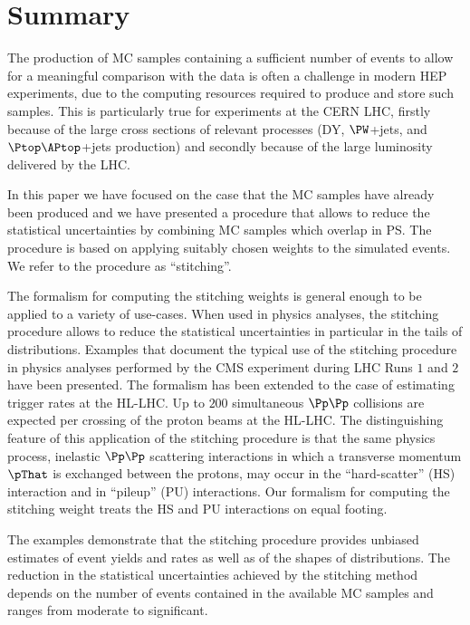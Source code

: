 \section{Summary}
\label{sec:summary}

The production of MC samples containing a sufficient number of events to allow for a meaningful comparison with the data is often a challenge in modern HEP experiments,
due to the computing resources required to produce and store such samples.
This is particularly true for experiments at the CERN LHC,
firstly because of the large cross sections of relevant processes (\eg DY, $\PW$+jets, and $\Ptop\APtop$+jets production)
and secondly because of the large luminosity delivered by the LHC.

In this paper we have focused on the case that the MC samples have already been produced
and we have presented a procedure that allows to reduce the statistical uncertainties 
by combining MC samples which overlap in PS.
The procedure is based on applying suitably chosen weights to the simulated events.
We refer to the procedure as ``stitching''.

The formalism for computing the stitching weights is general enough to be applied to a variety of use-cases.
When used in physics analyses, the stitching procedure allows to reduce the statistical uncertainties in particular in the tails of distributions.
Examples that document the typical use of the stitching procedure in physics analyses performed by the CMS experiment during LHC Runs $1$ and $2$ have been presented.
The formalism has been extended to the case of estimating trigger rates at the HL-LHC.
Up to  $200$ simultaneous $\Pp\Pp$ collisions are expected per crossing of the proton beams at the HL-LHC.
The distinguishing feature of this application of the stitching procedure is that the same physics process, 
inelastic $\Pp\Pp$ scattering interactions in which a transverse momentum $\pThat$ is exchanged between the protons,
may occur in the ``hard-scatter'' (HS) interaction and in ``pileup'' (PU) interactions.
Our formalism for computing the stitching weight treats the HS and PU interactions on equal footing.

The examples demonstrate that the stitching procedure provides unbiased estimates of event yields and rates as well as of the shapes of distributions.
The reduction in the statistical uncertainties achieved by the stitching method depends on the number of events contained in the available MC samples
and ranges from moderate to significant.
